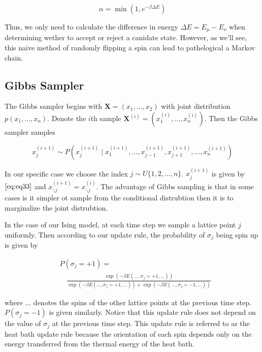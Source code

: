 \documentclass{article}
\begin{document}
\begin{equation}
    \alpha = \min(1, e^{-\beta \Delta E})
\end{equation}

Thus, we only need to calculate the difference in energy $\Delta E = E_{\mu} - E_{\nu}$ when determining wether to accept or reject a canidate state.
However, as we'll see, this naive method of randomly flipping a spin can lead to pathelogical a Markov chain.

\subsection{Gibbs Sampler}
The Gibbs sampler begins with $\mathbf{X} = (x_1, \ldots, x_2)$ with joint distribution $p(x_1, \ldots, x_n)$. Denote the $i$th sample
$\mathbf{X}^{(i)} = (x_1^{(i)}, \ldots, x_n^{(i)})$. Then the Gibbs sampler samples

\begin{equation} \label{eq:eq33}
    x_j^{(i+1)} \sim P(x_j^{(i+1)} \mid x_1^{(i+1)}, \ldots, x_{j-1}^{(i+1)}, x_{j+1}^{(i+1)}, \ldots, x_{n}^{(i+1)})
\end{equation}

In our specific case we choose the index $j \sim U\{1,2,\ldots, n\}$. $x_j^{(i+1)}$ is given by $\ref{eq:eq33}$ and 
$x_{\backslash j}^{(i+1)} = x_{\backslash j}^{(i)}$. The advantage of Gibbs sampling is that in some cases is it simpler ot sample from the conditional
distrubtion then it is to marginalize the joint distrubtion.

In the case of our Ising model, at each time step we sample a lattice point $j$ uniformly. Then according to our update rule, 
the probability of $\sigma_j$ being spin up is given by 

\begin{equation}
    \begin{split}
    &P(\sigma_j = +1) = \\
    &\quad \frac{\exp(-\beta E(\ldots, \sigma_j = +1, \ldots))}{\exp(-\beta E(\ldots, \sigma_j = +1, \ldots)) + \exp(-\beta E(\ldots, \sigma_j = -1, \ldots))}
    \end{split}
\end{equation}

where $\ldots$ denotes the spins of the other lattice points at the previous time step. $P(\sigma_j = -1)$ is given similarly. 
Notice that this update rule does not depend on the value of $\sigma_j$ at the previous time step. This update rule
is referred to as the heat bath update rule because the orientation of each spin depends only on the energy transferred from the thermal energy of the heat bath.
\end{document}
